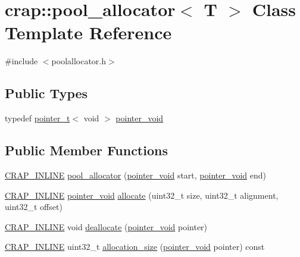 \hypertarget{classcrap_1_1pool__allocator}{}\section{crap\+:\+:pool\+\_\+allocator$<$ T $>$ Class Template Reference}
\label{classcrap_1_1pool__allocator}


{\ttfamily \#include $<$poolallocator.\+h$>$}

\subsection*{Public Types}
\begin{DoxyCompactItemize}
\item 
typedef \hyperlink{structcrap_1_1pointer__t}{pointer\+\_\+t}$<$ void $>$ \hyperlink{classcrap_1_1pool__allocator_a017b14f47ade2415878807d9f28fddce}{pointer\+\_\+void}
\end{DoxyCompactItemize}
\subsection*{Public Member Functions}
\begin{DoxyCompactItemize}
\item 
\hyperlink{config__x86_8h_a5a40526b8d842e7ff731509998bb0f1c}{C\+R\+A\+P\+\_\+\+I\+N\+L\+I\+N\+E} \hyperlink{classcrap_1_1pool__allocator_aae6bc00997872aa1a1507665f33cfe86}{pool\+\_\+allocator} (\hyperlink{classcrap_1_1pool__allocator_a017b14f47ade2415878807d9f28fddce}{pointer\+\_\+void} start, \hyperlink{classcrap_1_1pool__allocator_a017b14f47ade2415878807d9f28fddce}{pointer\+\_\+void} end)
\item 
\hyperlink{config__x86_8h_a5a40526b8d842e7ff731509998bb0f1c}{C\+R\+A\+P\+\_\+\+I\+N\+L\+I\+N\+E} \hyperlink{classcrap_1_1pool__allocator_a017b14f47ade2415878807d9f28fddce}{pointer\+\_\+void} \hyperlink{classcrap_1_1pool__allocator_ab0c964f5ebcac28ac4c722349635bdce}{allocate} (uint32\+\_\+t size, uint32\+\_\+t alignment, uint32\+\_\+t offset)
\item 
\hyperlink{config__x86_8h_a5a40526b8d842e7ff731509998bb0f1c}{C\+R\+A\+P\+\_\+\+I\+N\+L\+I\+N\+E} void \hyperlink{classcrap_1_1pool__allocator_aa4bfc41f084c92eb23ffaca9426bb6aa}{deallocate} (\hyperlink{classcrap_1_1pool__allocator_a017b14f47ade2415878807d9f28fddce}{pointer\+\_\+void} pointer)
\item 
\hyperlink{config__x86_8h_a5a40526b8d842e7ff731509998bb0f1c}{C\+R\+A\+P\+\_\+\+I\+N\+L\+I\+N\+E} uint32\+\_\+t \hyperlink{classcrap_1_1pool__allocator_ac893d4803503d82f2717e8f18d49bef6}{allocation\+\_\+size} (\hyperlink{classcrap_1_1pool__allocator_a017b14f47ade2415878807d9f28fddce}{pointer\+\_\+void} pointer) const 
\end{DoxyCompactItemize}


